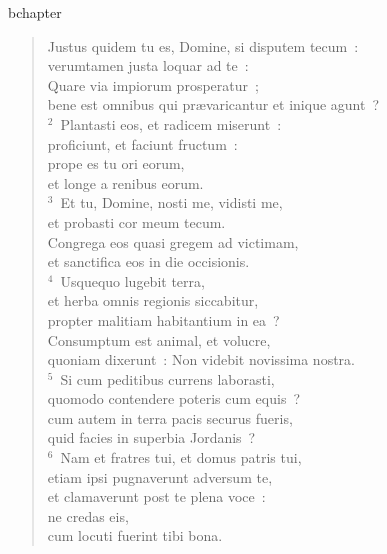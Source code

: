 bchapter\begin{flushleft}\begin{verse}\vspace{-19pt}\hspace{6pt}Justus quidem tu es, Domine, si disputem tecum~:\\\hspace{6pt} verumtamen justa loquar ad te~:\\ Quare via impiorum prosperatur~;\\ bene est omnibus qui pr\ae varicantur et inique agunt~?\\
${}^{2}$~Plantasti eos, et radicem miserunt~:\\ proficiunt, et faciunt fructum~:\\ prope es tu ori eorum,\\ et longe a renibus eorum.\\
${}^{3}$~Et tu, Domine, nosti me, vidisti me,\\ et probasti cor meum tecum.\\ Congrega eos quasi gregem ad victimam,\\ et sanctifica eos in die occisionis.\\
${}^{4}$~Usquequo lugebit terra,\\ et herba omnis regionis siccabitur,\\ propter malitiam habitantium in ea~?\\ Consumptum est animal, et volucre,\\ quoniam dixerunt~: Non videbit novissima nostra.\\
${}^{5}$~Si cum peditibus currens laborasti,\\ quomodo contendere poteris cum equis~?\\ cum autem in terra pacis securus fueris,\\ quid facies in superbia Jordanis~?\\
${}^{6}$~Nam et fratres tui, et domus patris tui,\\ etiam ipsi pugnaverunt adversum te,\\ et clamaverunt post te plena voce~:\\ ne credas eis,\\ cum locuti fuerint tibi bona.\end{verse}\end{flushleft}


